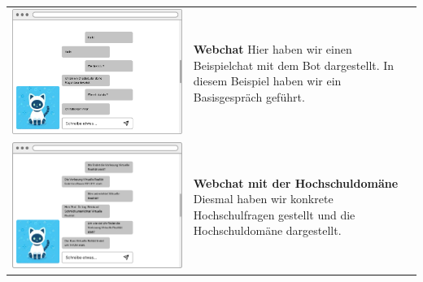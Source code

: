 \begin{tabular}{C{6cm}  L{7cm}}
    \includegraphics[width=\linewidth]{bilder/new vers. UI Design/WebChat/WebChat.png} & \textbf{Webchat} \newline 
    Hier haben wir einen Beispielchat mit dem Bot dargestellt. In diesem Beispiel haben wir ein
    Basisgespräch geführt. \\
    \includegraphics[width=\linewidth]{bilder/new vers. UI Design/WebChat/WebChat Hochschule.png} & \textbf{Webchat mit der Hochschuldomäne} \newline 
    Diesmal haben wir konkrete Hochschulfragen gestellt und die Hochschuldomäne dargestellt. \\

\end{tabular}
